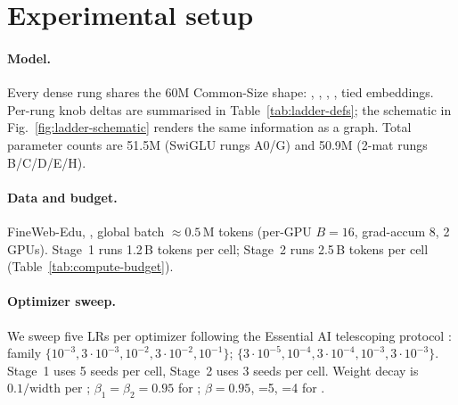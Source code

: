 \section{Experimental setup}\label{sec:setup}

\paragraph{Model.} Every dense rung shares the 60M Common-Size shape: , , , , tied embeddings. Per-rung knob deltas are summarised in Table~\ref{tab:ladder-defs}; the schematic in Fig.~\ref{fig:ladder-schematic} renders the same information as a graph. Total parameter counts are 51.5M (SwiGLU rungs A0/G) and 50.9M (2-mat rungs B/C/D/E/H).

\begin{table}[h]
\centering
\caption{Dense ladder rung definitions. The ``what changes'' column flags the single axis varied from the previous rung along each branch (top branch from A0: B$\to$C$\to$D$\to$E; bottom branch: A0$\to$G$\to$H).}\label{tab:ladder-defs}
\end{table}

\paragraph{Data and budget.} FineWeb-Edu, , global batch $\approx 0.5$\,M tokens (per-GPU $B=16$, grad-accum $8$, 2 GPUs). Stage~1 runs 1.2\,B tokens per cell; Stage~2 runs 2.5\,B tokens per cell (Table~\ref{tab:compute-budget}).

\begin{table}[h]
\centering
\caption{Compute budget per stage.}\label{tab:compute-budget}
\end{table}

\paragraph{Optimizer sweep.}
We sweep five LRs per optimizer following the Essential AI telescoping protocol \citep{shah2025essential}: \optMuon{} family $\{10^{-3}, 3\!\cdot\!10^{-3}, 10^{-2}, 3\!\cdot\!10^{-2}, 10^{-1}\}$; \optAdamW{} $\{3\!\cdot\!10^{-5}, 10^{-4}, 3\!\cdot\!10^{-4}, 10^{-3}, 3\!\cdot\!10^{-3}\}$. Stage~1 uses 5 seeds per cell, Stage~2 uses 3 seeds per cell. Weight decay is $0.1 / \mathrm{width}$ per \citet{qiu2025hp}; $\beta_1 = \beta_2 = 0.95$ for \optAdamW; $\beta = 0.95$, =5, =4 for \optCoupled.

